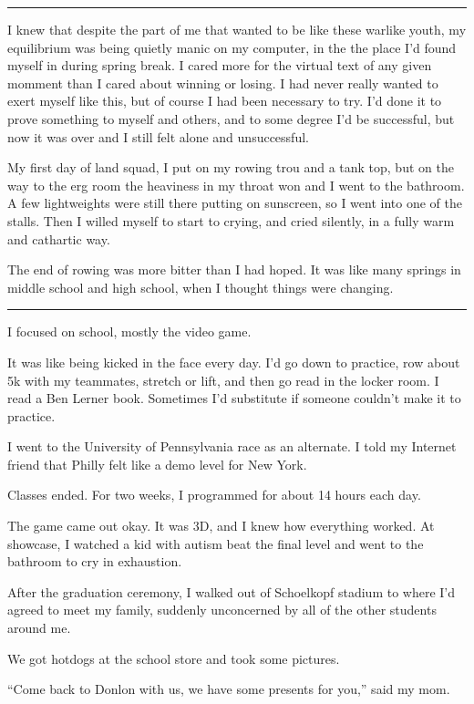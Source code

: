 \plainfancybreak{12pt}{2}{* * *}

I knew that despite the part of me that wanted to be like these warlike youth,
my equilibrium was being quietly manic on my computer, in the the place I'd
found myself in during spring break.  I cared more for the virtual text of any
given momment than I cared about winning or losing.  I had never really wanted
to exert myself like this, but of course I had been necessary to try.  I'd done
it to prove something to myself and others, and to some degree I'd be
successful, but now it was over and I still felt alone and unsuccessful.

My first day of land squad, I put on my rowing trou and a tank top, but on the
way to the erg room the heaviness in my throat won and I went to the bathroom.
A few lightweights  were still there putting on sunscreen, so I went into one of
the stalls.  Then I willed myself to start to crying, and cried silently, in a
fully warm and cathartic way.  

The end of rowing was more bitter than I had hoped.  It was like many springs in
middle school and high school, when I thought things were changing.


\plainfancybreak{12pt}{2}{* * *}

I focused on school, mostly the video game. 

It was like being kicked in the face every day.  I'd go down to practice, row
about 5k with my teammates, stretch or lift, and then go read in the locker
room.  I read a Ben Lerner book.  Sometimes I'd substitute if someone couldn't
make it to practice.

I went to the University of Pennsylvania race as an alternate.  I told my
Internet friend that Philly felt like a demo level for New York.

Classes ended.  For two weeks, I programmed for about 14 hours each day.  

The game came out okay.  It was 3D, and I knew how everything worked.  At
showcase, I watched a kid with autism beat the final level and went to the
bathroom to cry in exhaustion.

After the graduation ceremony, I walked out of Schoelkopf stadium to where I'd
agreed to meet my family, suddenly unconcerned by all of the other students
around me.

We got hotdogs at the school store and took some pictures.  

``Come back to Donlon with us, we have some presents for you,'' said my mom. 

